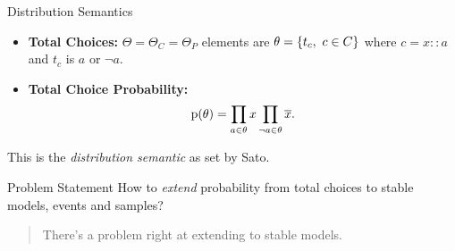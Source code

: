 \documentclass{beamer}
\newcommand{\at}[1]{\ensuremath{\!\del{#1}}}
\newcommand{\co}[1]{\ensuremath{\overline{#1}}}
\newcommand{\fml}[1]{\ensuremath{{\cal #1}}}
\newcommand{\cset}[2]{\ensuremath{\set{#1,~#2}}}
\newcommand{\pr}[1]{\ensuremath{\mathrm{p}\at{#1}}}
\begin{document}
\begin{frame}{Distribution Semantics}
    \begin{itemize}
        \item \textbf{Total Choices:} $\Theta = \Theta_C = \Theta_P$ elements are  $\theta = \cset{t_c}{c \in C}$ where $c=x::a$ and $t_c$ is $a$ or $\neg a$.  
        
        \item \textbf{Total Choice Probability:}
        \begin{equation}
            \pr{\theta} = \prod_{a \in \theta}x \prod_{\neg a \in \theta}\co{x}.\label{eq:prob.tc}
        \end{equation}
    \end{itemize}
    This is the \emph{distribution semantic} as set by Sato.
\end{frame}
\begin{frame}
    \begin{block}{Problem Statement}
        How to \textit{extend} probability from total choices to stable models, events and samples?
    \end{block}
    \begin{quotation}
        There's a problem right at extending to stable models.
    \end{quotation}
\end{frame}
\end{document}
